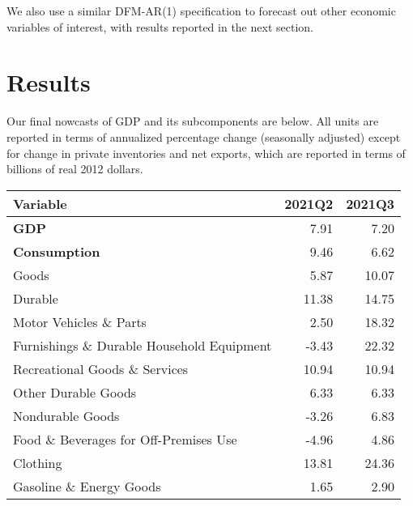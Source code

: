 \documentclass[11pt, letterpaper]{article}\usepackage[]{graphicx}\usepackage[]{color}
\begin{document}
We also use a similar DFM-AR(1) specification to forecast out other economic variables of interest, with results reported in the next section.


\section{Results}
Our final nowcasts of GDP and its subcomponents are below. All units are reported in terms of annualized percentage change (seasonally adjusted) except for change in private inventories and net exports, which are reported in terms of billions of real 2012 dollars.
\begin{table}[H]
\centering
\begingroup\fontsize{10pt}{12pt}\selectfont
\begin{tabular}{lrr}
  \hline
Variable & 2021Q2 & 2021Q3 \\ 
  \hline
\hspace{0mm} \textbf{GDP} & 7.91 & 7.20 \\ 
  \hspace{0mm} \textbf{Consumption} & 9.46 & 6.62 \\ 
  \hspace{8mm}  Goods & 5.87 & 10.07 \\ 
  \hspace{16mm}  Durable & 11.38 & 14.75 \\ 
  \hspace{24mm}  Motor Vehicles \& Parts & 2.50 & 18.32 \\ 
  \hspace{24mm}  Furnishings \& Durable Household Equipment & -3.43 & 22.32 \\ 
  \hspace{24mm}  Recreational Goods \& Services & 10.94 & 10.94 \\ 
  \hspace{24mm}  Other Durable Goods & 6.33 & 6.33 \\ 
  \hspace{16mm}  Nondurable Goods & -3.26 & 6.83 \\ 
  \hspace{24mm}  Food \& Beverages for Off-Premises Use & -4.96 & 4.86 \\ 
  \hspace{24mm}  Clothing & 13.81 & 24.36 \\ 
  \hspace{24mm}  Gasoline \& Energy Goods & 1.65 & 2.90 \\ 

\end{tabular}
\end{table}
\end{document}
